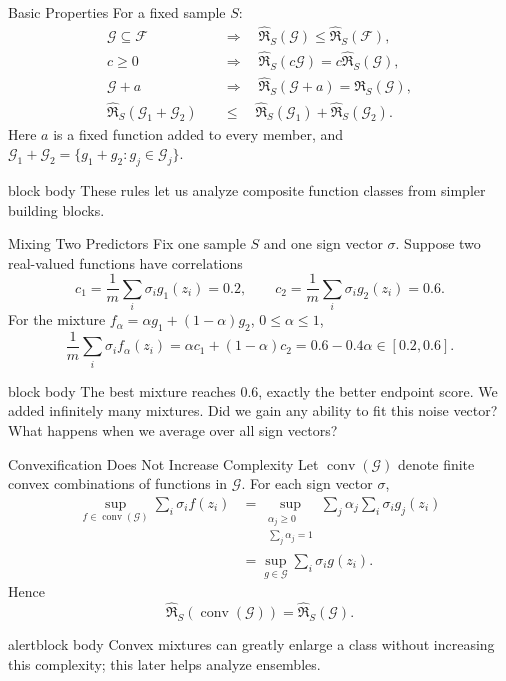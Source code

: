 \documentclass[aspectratio=169,10pt]{beamer}
\newcommand{\Gc}{\mathcal{G}}
\newcommand{\Fc}{\mathcal{F}}
\newcommand{\RadS}{\widehat{\mathfrak{R}}_S}
\newcommand{\KeyBox}[1]{%
  \begin{beamercolorbox}[rounded=true,sep=0.22cm,wd=\linewidth]{block body}
    #1
  \end{beamercolorbox}%
}
\newcommand{\OrangeBox}[1]{%
  \begin{beamercolorbox}[rounded=true,sep=0.22cm,wd=\linewidth]{alertblock body}
    #1
  \end{beamercolorbox}%
}
\begin{document}
\begin{frame}[t]{Basic Properties}
  \vspace{0.01cm}
  For a fixed sample $S$:
  \begin{align*}
    \Gc\subseteq\Fc
      &\quad\Longrightarrow\quad \RadS(\Gc)\le \RadS(\Fc),\\[0.08cm]
    c\ge 0
      &\quad\Longrightarrow\quad \RadS(c\Gc)=c\RadS(\Gc),\\[0.08cm]
    \Gc+a
      &\quad\Longrightarrow\quad \RadS(\Gc+a)=\RadS(\Gc),\\[0.08cm]
    \RadS(\Gc_1+\Gc_2)
      &\quad\le\quad \RadS(\Gc_1)+\RadS(\Gc_2).
  \end{align*}
  Here $a$ is a fixed function added to every member, and
  $\Gc_1+\Gc_2=\{g_1+g_2:g_j\in\Gc_j\}$.
  \vspace{0.10cm}
  \KeyBox{These rules let us analyze composite function classes from simpler building blocks.}
\end{frame}

\begin{frame}[t]{Mixing Two Predictors}
  \vspace{0.03cm}
  \small
  Fix one sample $S$ and one sign vector $\sigma$.  Suppose two real-valued
  functions have correlations
  \[
    c_1=\frac1m\sum_i\sigma_i g_1(z_i)=0.2,
    \qquad
    c_2=\frac1m\sum_i\sigma_i g_2(z_i)=0.6.
  \]
  For the mixture $f_\alpha=\alpha g_1+(1-\alpha)g_2$, $0\le\alpha\le1$,
  \[
    \frac1m\sum_i\sigma_i f_\alpha(z_i)
      =\alpha c_1+(1-\alpha)c_2
      =0.6-0.4\alpha\in[0.2,0.6].
  \]
  \vspace{0.02cm}
  \KeyBox{\centering
    The best mixture reaches $0.6$, exactly the better endpoint score.
    We added infinitely many mixtures. Did we gain any ability to fit this
    noise vector? What happens when we average over all sign vectors?
  }

\end{frame}

\begin{frame}[t]{Convexification Does Not Increase Complexity}
  \vspace{0.03cm}
  \small
  Let $\operatorname{conv}(\Gc)$ denote finite convex combinations of functions in $\Gc$. For each sign vector $\sigma$,
  \begin{align*}
    \sup_{f\in\operatorname{conv}(\Gc)}\sum_i\sigma_i f(z_i)
    &=\sup_{\substack{\alpha_j\ge0\\\sum_j\alpha_j=1}}
      \sum_j\alpha_j\sum_i\sigma_i g_j(z_i)\\
    &=\sup_{g\in\Gc}\sum_i\sigma_i g(z_i).
  \end{align*}
  Hence
  \[
    \boxed{\RadS(\operatorname{conv}(\Gc))=\RadS(\Gc).}
  \]
  \vspace{0.08cm}
  \OrangeBox{\footnotesize Convex mixtures can greatly enlarge a class without increasing this complexity; this later helps analyze ensembles.}
\end{frame}
\end{document}
